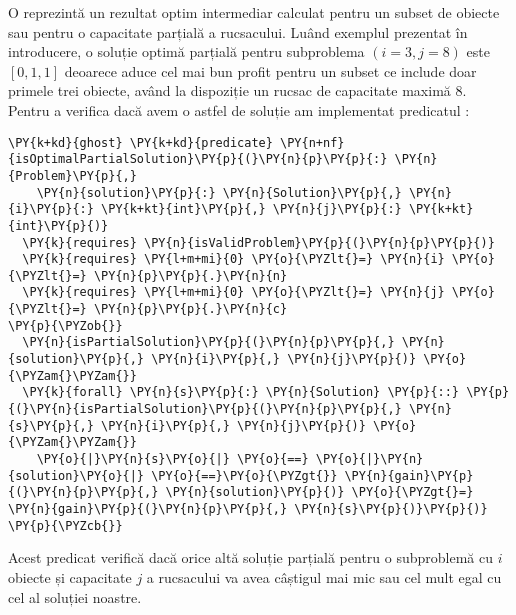 \begin{sloppypar}
O  reprezintă un rezultat optim intermediar calculat pentru un subset de obiecte sau pentru o capacitate parțială a rucsacului. Luând exemplul prezentat în introducere, o soluție optimă parțială pentru subproblema $(i = 3, j = 8)$ este $[0, 1, 1]$ deoarece aduce cel mai bun profit pentru un subset ce include doar primele trei obiecte, având la dispoziție un rucsac de capacitate maximă 8. Pentru a verifica dacă avem o astfel de soluție am implementat predicatul :
    \begin{Verbatim}[commandchars=\\\{\}]
\PY{k+kd}{ghost} \PY{k+kd}{predicate} \PY{n+nf}{isOptimalPartialSolution}\PY{p}{(}\PY{n}{p}\PY{p}{:} \PY{n}{Problem}\PY{p}{,} 
    \PY{n}{solution}\PY{p}{:} \PY{n}{Solution}\PY{p}{,} \PY{n}{i}\PY{p}{:} \PY{k+kt}{int}\PY{p}{,} \PY{n}{j}\PY{p}{:} \PY{k+kt}{int}\PY{p}{)}
  \PY{k}{requires} \PY{n}{isValidProblem}\PY{p}{(}\PY{n}{p}\PY{p}{)}
  \PY{k}{requires} \PY{l+m+mi}{0} \PY{o}{\PYZlt{}=} \PY{n}{i} \PY{o}{\PYZlt{}=} \PY{n}{p}\PY{p}{.}\PY{n}{n}
  \PY{k}{requires} \PY{l+m+mi}{0} \PY{o}{\PYZlt{}=} \PY{n}{j} \PY{o}{\PYZlt{}=} \PY{n}{p}\PY{p}{.}\PY{n}{c}
\PY{p}{\PYZob{}}
  \PY{n}{isPartialSolution}\PY{p}{(}\PY{n}{p}\PY{p}{,} \PY{n}{solution}\PY{p}{,} \PY{n}{i}\PY{p}{,} \PY{n}{j}\PY{p}{)} \PY{o}{\PYZam{}\PYZam{}}
  \PY{k}{forall} \PY{n}{s}\PY{p}{:} \PY{n}{Solution} \PY{p}{::} \PY{p}{(}\PY{n}{isPartialSolution}\PY{p}{(}\PY{n}{p}\PY{p}{,} \PY{n}{s}\PY{p}{,} \PY{n}{i}\PY{p}{,} \PY{n}{j}\PY{p}{)} \PY{o}{\PYZam{}\PYZam{}} 
    \PY{o}{|}\PY{n}{s}\PY{o}{|} \PY{o}{==} \PY{o}{|}\PY{n}{solution}\PY{o}{|} \PY{o}{==}\PY{o}{\PYZgt{}} \PY{n}{gain}\PY{p}{(}\PY{n}{p}\PY{p}{,} \PY{n}{solution}\PY{p}{)} \PY{o}{\PYZgt{}=} \PY{n}{gain}\PY{p}{(}\PY{n}{p}\PY{p}{,} \PY{n}{s}\PY{p}{)}\PY{p}{)}
\PY{p}{\PYZcb{}}
\end{Verbatim}
\par Acest predicat verifică dacă orice altă soluție parțială pentru o subproblemă cu $i$ obiecte și capacitate $j$ a rucsacului va avea câștigul mai mic sau cel mult egal cu cel al soluției noastre. 

\end{sloppypar}